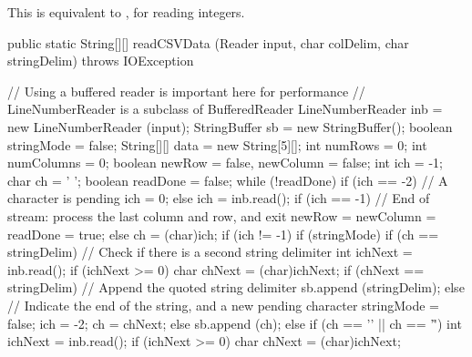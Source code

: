 \begin{tabb}   This is equivalent to ,
   for reading integers.
\end{tabb}
\begin{htmlonly}
\end{htmlonly}
\begin{code}

   public static String[][] readCSVData (Reader input, char colDelim,
                                         char stringDelim)
                                         throws IOException\begin{hide} {
      // Using a buffered reader is important here for performance
      // LineNumberReader is a subclass of BufferedReader
      LineNumberReader inb = new LineNumberReader (input);
      StringBuffer sb = new StringBuffer();
      boolean stringMode = false;
      String[][] data = new String[5][];
      int numRows = 0;
      int numColumns = 0;
      boolean newRow = false, newColumn = false;
      int ich = -1;
      char ch = ' ';
      boolean readDone = false;
      while (!readDone) {
         if (ich == -2)
            // A character is pending
            ich = 0;
         else {
            ich = inb.read();
            if (ich == -1)
               // End of stream: process the last column and row, and exit
               newRow = newColumn = readDone = true;
            else
               ch = (char)ich;
         }
         if (ich != -1) {
            if (stringMode) {
               if (ch == stringDelim) {
                  // Check if there is a second string delimiter
                  int ichNext = inb.read();
                  if (ichNext >= 0) {
                     char chNext = (char)ichNext;
                     if (chNext == stringDelim)
                        // Append the quoted string delimiter
                        sb.append (stringDelim);
                     else {
                        // Indicate the end of the string, and a new pending character
                        stringMode = false;
                        ich = -2;
                        ch = chNext;
                     }
                  }
               }
               else
                  sb.append (ch);
            }
            else {
              if (ch == '\n' || ch == '\r') {
                 int ichNext = inb.read();
                 if (ichNext >= 0) {
                    char chNext = (char)ichNext;
}}}}}}
\end{hide}
\end{code}
